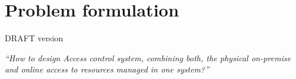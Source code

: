 \section{Problem formulation} \label{problemFormulation}

DRAFT version

\textit{“How to design Access control system, combining both, the physical on-premise and online access to resources managed in one system?”}
